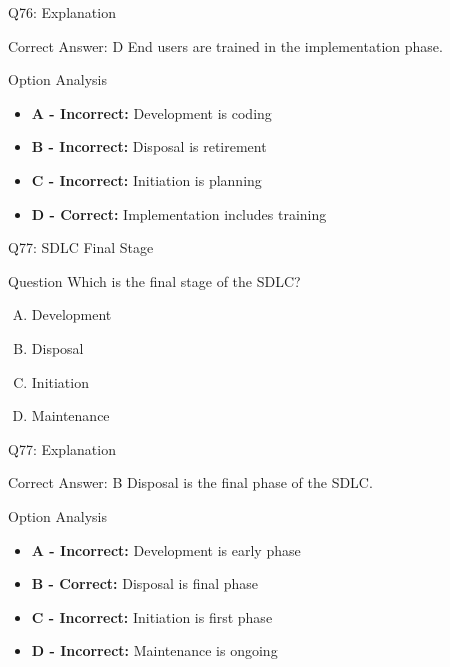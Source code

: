 \documentclass{beamer}
\begin{document}
	\begin{frame}{Q76: Explanation}
		\begin{block}{Correct Answer: D}
			End users are trained in the implementation phase.
		\end{block}
		\begin{block}{Option Analysis}
			\begin{itemize}
				\item \textbf{A - Incorrect:} Development is coding
				\item \textbf{B - Incorrect:} Disposal is retirement
				\item \textbf{C - Incorrect:} Initiation is planning
				\item \textbf{D - Correct:} Implementation includes training
			\end{itemize}
		\end{block}
	\end{frame}
	
	\begin{frame}{Q77: SDLC Final Stage}
		\begin{block}{Question}
			Which is the final stage of the SDLC?
		\end{block}
		\begin{enumerate}[(A)]
			\item Development
			\item Disposal
			\item Initiation
			\item Maintenance
		\end{enumerate}
	\end{frame}
	
	\begin{frame}{Q77: Explanation}
		\begin{block}{Correct Answer: B}
			Disposal is the final phase of the SDLC.
		\end{block}
		\begin{block}{Option Analysis}
			\begin{itemize}
				\item \textbf{A - Incorrect:} Development is early phase
				\item \textbf{B - Correct:} Disposal is final phase
				\item \textbf{C - Incorrect:} Initiation is first phase
				\item \textbf{D - Incorrect:} Maintenance is ongoing
			\end{itemize}
		\end{block}
	\end{frame}
	
\end{document}

